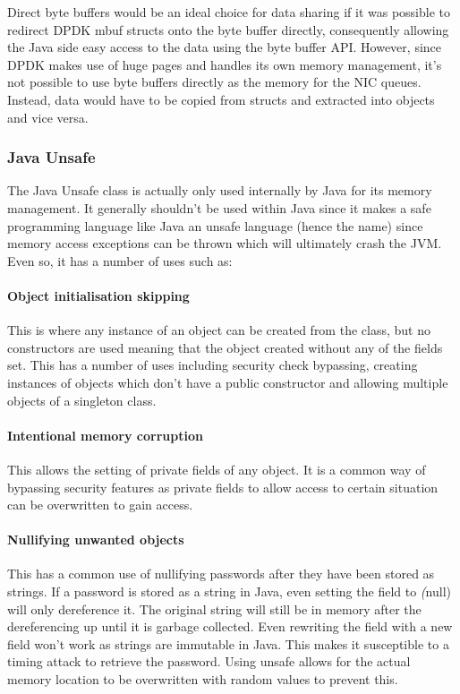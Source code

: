 \documentclass[final_report.tex]{subfiles}
\begin{document}
Direct byte buffers would be an ideal choice for data sharing if it was possible to redirect DPDK mbuf structs onto the byte buffer directly, consequently allowing the Java side easy access to the data using the byte buffer API. However, since DPDK makes use of huge pages and handles its own memory management, it's not possible to use byte buffers directly as the memory for the NIC queues. Instead, data would have to be copied from structs and extracted into objects and vice versa.

\subsubsection{Java Unsafe}
The Java Unsafe class is actually only used internally by Java for its memory management. It generally shouldn't be used within Java since it makes a safe programming language like Java an unsafe language (hence the name) since memory access exceptions can be thrown which will ultimately crash the JVM. Even so, it has a number of uses such as:

\paragraph*{Object initialisation skipping}
This is where any instance of an object can be created from the class, but no constructors are used meaning that the object created without any of the fields set. This has a number of uses including security check bypassing, creating instances of objects which don't have a public constructor and allowing multiple objects of a singleton class.

\paragraph*{Intentional memory corruption}
This allows the setting of private fields of any object. It is a common way of bypassing security features as private fields to allow access to certain situation can be overwritten to gain access.

\paragraph*{Nullifying unwanted objects}
This has a common use of nullifying passwords after they have been stored as strings. If a password is stored as a string in Java, even setting the field to \textit(null) will only dereference it. The original string will still be in memory after the dereferencing up until it is garbage collected. Even rewriting the field with a new field won't work as strings are immutable in Java. This makes it susceptible to a timing attack to retrieve the password. Using unsafe allows for the actual memory location to be overwritten with random values to prevent this.
\end{document}
